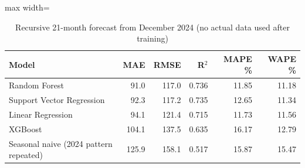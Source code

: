 \begin{table}[htbp]
\centering
\small
\caption{Recursive 21-month forecast from December 2024 (no actual data used after training)}
\label{tab:recursive}
\begin{adjustbox}{max width=\linewidth}
\begin{tabular}{lrrrrr}
\toprule
\textbf{Model} & \textbf{MAE} & \textbf{RMSE} & \textbf{R$^2$} & \textbf{MAPE \%} & \textbf{WAPE \%} \\
\midrule
Random Forest & 91.0 & 117.0 & 0.736 & 11.85 & 11.18 \\
Support Vector Regression & 92.3 & 117.2 & 0.735 & 12.65 & 11.34 \\
Linear Regression & 94.1 & 121.4 & 0.715 & 11.73 & 11.56 \\
XGBoost & 104.1 & 137.5 & 0.635 & 16.17 & 12.79 \\
Seasonal naive (2024 pattern repeated) & 125.9 & 158.1 & 0.517 & 15.87 & 15.47 \\
\bottomrule
\end{tabular}
\end{adjustbox}
\end{table}